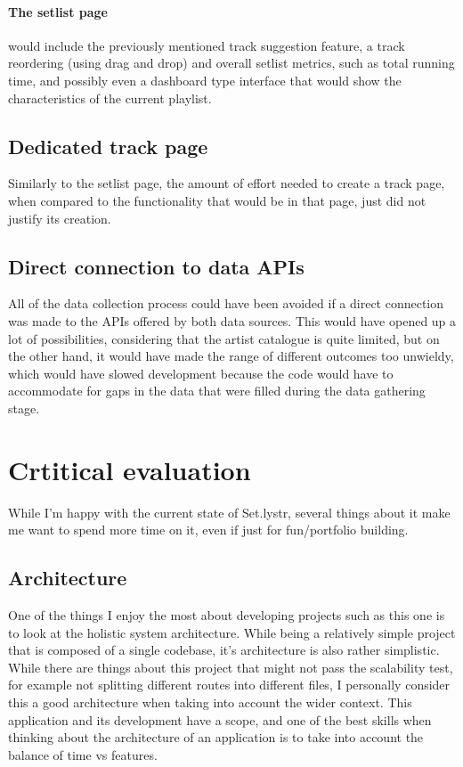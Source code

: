 \documentclass[10pt, a4paper]{article}
\begin{document}
	\paragraph{The setlist page} would include the previously mentioned track suggestion feature, a track reordering (using drag and drop) and overall setlist metrics, such as total running time, and possibly even a dashboard type interface that would show the characteristics of the current playlist.
	
	\subsection{Dedicated track page}
	Similarly to the setlist page, the amount of effort needed to create a track page, when compared to the functionality that would be in that page, just did not justify its creation. 
	
	\subsection{Direct connection to data APIs}
	All of the data collection process could have been avoided if a direct connection was made to the APIs offered by both data sources. This would have opened up a lot of possibilities, considering that the artist catalogue is quite limited, but on the other hand, it would have made the range of different outcomes too unwieldy, which would have slowed development because the code would have to accommodate for gaps in the data that were filled during the data gathering stage.
	
\section{Crtitical evaluation}
	While I'm happy with the current state of Set.lystr, several things about it make me want to spend more time on it, even if just for fun/portfolio building.

	\subsection{Architecture}
	One of the things I enjoy the most about developing projects such as this one is to look at the holistic  system architecture. While being a relatively simple project that is composed of a single codebase, it's architecture is also rather simplistic. While there are things about this project that might not pass the scalability test, for example not splitting different routes into different files, I personally consider this a good architecture when taking into account the wider context. This application and its development have a scope, and one of the best skills when thinking about the architecture of an application is to take into account the balance of time vs features.
\end{document}
